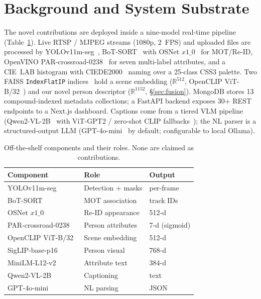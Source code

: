 ﻿\documentclass[conference]{IEEEtran}
\theoremstyle{definition}
\begin{document}
\section{Background and System Substrate}

The novel contributions are deployed inside a nine-model real-time pipeline (Table~\ref{tab:models}). Live RTSP / MJPEG streams (1080p, 2~FPS) and uploaded files are processed by YOLOv11m-seg~\cite{b14}, BoT-SORT~\cite{b22} with OSNet $x1\_0$~\cite{b22b} for MOT/Re-ID, OpenVINO PAR-crossroad-0238~\cite{b15} for seven multi-label attributes, and a CIE~LAB histogram with CIEDE2000~\cite{b16} naming over a 25-class CSS3 palette. Two FAISS \texttt{IndexFlatIP} indices~\cite{b25} hold a scene embedding ($\mathbb{R}^{512}$, OpenCLIP ViT-B/32~\cite{b18b}) and our novel person descriptor ($\mathbb{R}^{1152}$, \S\ref{sec:fusion}). MongoDB stores 13 compound-indexed metadata collections; a FastAPI backend exposes 30+ REST endpoints to a Next.js dashboard. Captions come from a tiered VLM pipeline (Qwen2-VL-2B~\cite{b17} with ViT-GPT2 / zero-shot CLIP fallbacks~\cite{b18,b18b,b19}); the NL parser is a structured-output LLM (GPT-4o-mini~\cite{b20} by default; configurable to local Ollama).

\begin{table}[!t]
\caption{Off-the-shelf components and their roles. None are claimed as contributions.}
\label{tab:models}
\centering
\footnotesize
\begin{tabular}{@{}lll@{}}
\toprule
Component & Role & Output \\
\midrule
YOLOv11m-seg~\cite{b14}     & Detection + masks       & per-frame \\
BoT-SORT~\cite{b22}          & MOT association         & track IDs \\
OSNet $x1\_0$~\cite{b22b}    & Re-ID appearance        & 512-d \\
PAR-crossroad-0238~\cite{b15}& Person attributes       & 7-d (sigmoid) \\
OpenCLIP ViT-B/32~\cite{b18b}& Scene embedding         & 512-d \\
SigLIP-base-p16~\cite{b24}   & Person visual           & 768-d \\
MiniLM-L12-v2~\cite{b23}     & Attribute text          & 384-d \\
Qwen2-VL-2B~\cite{b17}       & Captioning              & text \\
GPT-4o-mini~\cite{b20}       & NL parsing              & JSON \\
\bottomrule
\end{tabular}
\end{table}
\end{document}
